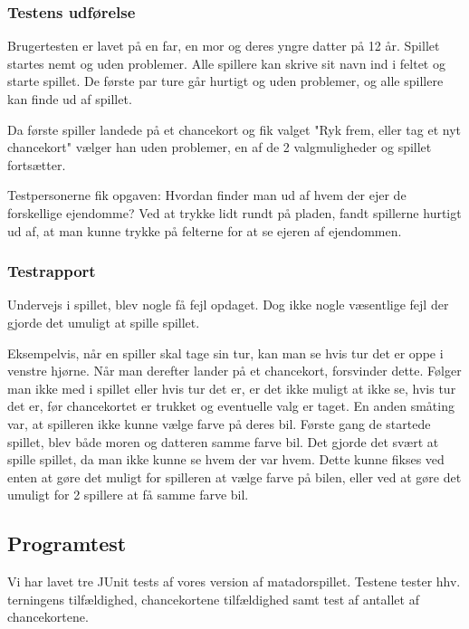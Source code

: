\subsubsection{Testens udførelse}
Brugertesten er lavet på en far, en mor og deres yngre datter på 12 år. 
Spillet startes nemt og uden problemer. Alle spillere kan skrive sit navn ind i feltet og starte spillet. De første par ture går hurtigt og uden problemer, og alle spillere kan finde ud af spillet. 

Da første spiller landede på et chancekort og fik valget "Ryk frem, eller tag et nyt chancekort" vælger han uden problemer, en af de 2 valgmuligheder og spillet fortsætter.

Testpersonerne fik opgaven: Hvordan finder man ud af hvem der ejer de forskellige ejendomme?
Ved at trykke lidt rundt på pladen, fandt spillerne hurtigt ud af, at man kunne trykke på felterne for at se ejeren af ejendommen. 

\subsubsection{Testrapport}
Undervejs i spillet, blev nogle få fejl opdaget. Dog ikke nogle væsentlige fejl der gjorde det umuligt at spille spillet. 

Eksempelvis, når en spiller skal tage sin tur, kan man se hvis tur det er oppe i venstre hjørne. Når man derefter lander på et chancekort, forsvinder dette. Følger man ikke med i spillet eller hvis tur det er, er det ikke muligt at ikke se, hvis tur det er, før chancekortet er trukket og eventuelle valg er taget. 
En anden småting var, at spilleren ikke kunne vælge farve på deres bil. Første gang de startede spillet, blev både moren og datteren samme farve bil. Det gjorde det svært at spille spillet, da man ikke kunne se hvem der var hvem. Dette kunne fikses ved enten at gøre det muligt for spilleren at vælge farve på bilen, eller ved at gøre det umuligt for 2 spillere at få samme farve bil. 



\subsection{Programtest}
Vi har lavet tre JUnit tests af vores version af matadorspillet. Testene tester hhv. terningens tilfældighed, chancekortene tilfældighed samt test af antallet af chancekortene.

